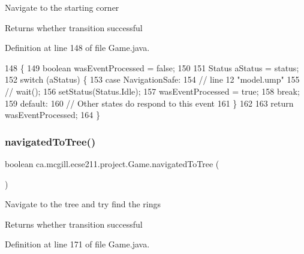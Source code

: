 Navigate to the starting corner

\begin{DoxyReturn}{Returns}
whether transition successful 
\end{DoxyReturn}


Definition at line 148 of file Game.\+java.


\begin{DoxyCode}
148                                     \{
149     \textcolor{keywordtype}{boolean} wasEventProcessed = \textcolor{keyword}{false};
150 
151     Status aStatus = status;
152     \textcolor{keywordflow}{switch} (aStatus) \{
153       \textcolor{keywordflow}{case} NavigationSafe:
154         \textcolor{comment}{// line 12 "model.ump"}
155         \textcolor{comment}{// wait();}
156         setStatus(Status.Idle);
157         wasEventProcessed = \textcolor{keyword}{true};
158         \textcolor{keywordflow}{break};
159       \textcolor{keywordflow}{default}:
160         \textcolor{comment}{// Other states do respond to this event}
161     \}
162 
163     \textcolor{keywordflow}{return} wasEventProcessed;
164   \}
\end{DoxyCode}
\mbox{\label{enumca_1_1mcgill_1_1ecse211_1_1project_1_1_game_aed641f9ade50f0090096a46d90588eb7}} 
\subsubsection{\texorpdfstring{navigated\+To\+Tree()}{navigatedToTree()}}
{\footnotesize\ttfamily boolean ca.\+mcgill.\+ecse211.\+project.\+Game.\+navigated\+To\+Tree (\begin{DoxyParamCaption}{ }\end{DoxyParamCaption})}

Navigate to the tree and try find the rings

\begin{DoxyReturn}{Returns}
whether transition successful 
\end{DoxyReturn}


Definition at line 171 of file Game.\+java.


